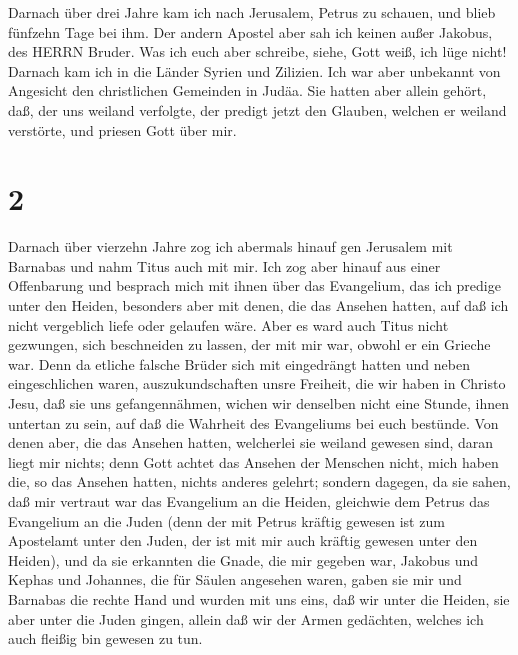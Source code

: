  Darnach über drei Jahre kam ich nach Jerusalem, Petrus zu
schauen, und blieb fünfzehn Tage bei ihm.  Der andern
Apostel aber sah ich keinen außer Jakobus, des HERRN Bruder.
 Was ich euch aber schreibe, siehe, Gott weiß, ich lüge
nicht!  Darnach kam ich in die Länder Syrien und Zilizien.
 Ich war aber unbekannt von Angesicht den christlichen
Gemeinden in Judäa.  Sie hatten aber allein gehört, daß,
der uns weiland verfolgte, der predigt jetzt den Glauben, welchen er
weiland verstörte,  und priesen Gott über mir.

\hypertarget{section-1}{%
\section{2}\label{section-1}}

 Darnach über vierzehn Jahre zog ich abermals hinauf gen
Jerusalem mit Barnabas und nahm Titus auch mit mir.  Ich zog
aber hinauf aus einer Offenbarung und besprach mich mit ihnen über das
Evangelium, das ich predige unter den Heiden, besonders aber mit denen,
die das Ansehen hatten, auf daß ich nicht vergeblich liefe oder gelaufen
wäre.  Aber es ward auch Titus nicht gezwungen, sich
beschneiden zu lassen, der mit mir war, obwohl er ein Grieche war.
 Denn da etliche falsche Brüder sich mit eingedrängt hatten
und neben eingeschlichen waren, auszukundschaften unsre Freiheit, die
wir haben in Christo Jesu, daß sie uns gefangennähmen, 
wichen wir denselben nicht eine Stunde, ihnen untertan zu sein, auf daß
die Wahrheit des Evangeliums bei euch bestünde.  Von denen
aber, die das Ansehen hatten, welcherlei sie weiland gewesen sind, daran
liegt mir nichts; denn Gott achtet das Ansehen der Menschen nicht, mich
haben die, so das Ansehen hatten, nichts anderes gelehrt; 
sondern dagegen, da sie sahen, daß mir vertraut war das Evangelium an
die Heiden, gleichwie dem Petrus das Evangelium an die Juden
 (denn der mit Petrus kräftig gewesen ist zum Apostelamt
unter den Juden, der ist mit mir auch kräftig gewesen unter den Heiden),
 und da sie erkannten die Gnade, die mir gegeben war,
Jakobus und Kephas und Johannes, die für Säulen angesehen waren, gaben
sie mir und Barnabas die rechte Hand und wurden mit uns eins, daß wir
unter die Heiden, sie aber unter die Juden gingen,  allein
daß wir der Armen gedächten, welches ich auch fleißig bin gewesen zu
tun.


